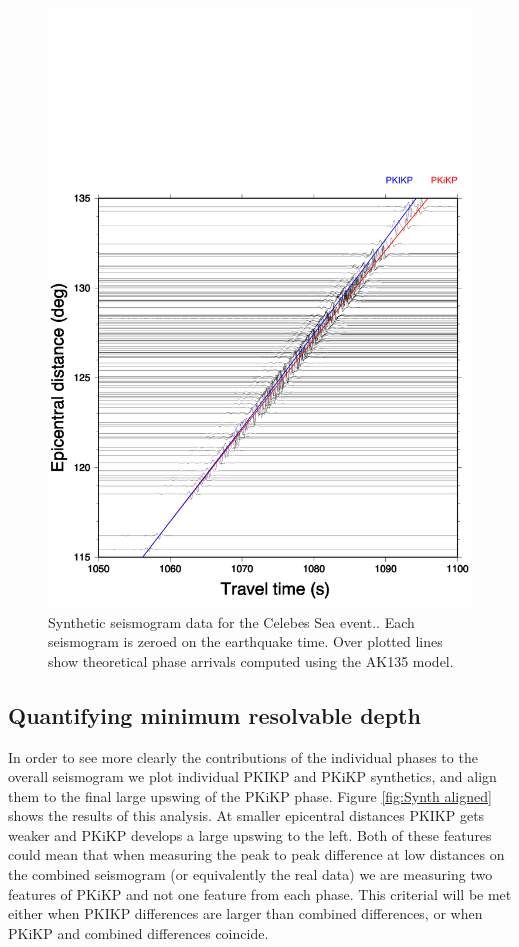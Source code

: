 \documentclass[11pt,a4paper]{article}
\begin{document}
\begin{figure}
	\includegraphics[width=\textwidth]{figures/celebessea_synthetic_both.pdf}
	\caption{Synthetic seismogram data for the Celebes Sea event.. Each seismogram is zeroed on the earthquake time. Over plotted lines show theoretical phase arrivals computed using the AK135 model.}
	\label{fig:Synth nonaligned}
\end{figure}

\subsection{Quantifying minimum resolvable depth}
In order to see more clearly the contributions of the individual phases to the overall seismogram we plot individual PKIKP and PKiKP synthetics, and align them to the final large upswing of the PKiKP phase. Figure \ref{fig:Synth aligned} shows the results of this analysis. At smaller epicentral distances PKIKP gets weaker and PKiKP develops a large upswing to the left. Both of these features could mean that when measuring the peak to peak difference at low distances on the combined seismogram (or equivalently the real data) we are measuring two features of PKiKP and not one feature from each phase. This criterial will be met either when PKIKP differences are larger than combined differences, or when PKiKP and combined differences coincide.
\end{document}
